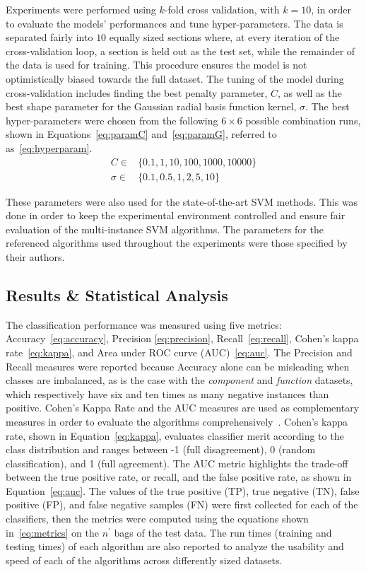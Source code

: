 \documentclass[preprint,12pt]{elsarticle}
\begin{document}
Experiments were performed using $k$-fold cross validation, with $k = 10$, in order to evaluate the models' performances and tune hyper-parameters. The data is separated fairly into $10$ equally sized sections where, at every iteration of the cross-validation loop, a section is held out as the test set, while the remainder of the data is used for training. This procedure ensures the model is not optimistically biased towards the full dataset. The tuning of the model during cross-validation includes finding the best penalty parameter, $C$, as well as the best shape parameter for the Gaussian radial basis function kernel, $\sigma$. The best hyper-parameters were chosen from the following $6 \times 6$ possible combination runs, shown in Equations~\eqref{eq:paramC} and~\eqref{eq:paramG}, referred to as~\eqref{eq:hyperparam}. 
\begin{subequations}
\label{eq:hyperparam}
\begin{align}
C \in  & \{0.1, 1, 10, 100, 1000, 10000\} \label{eq:paramC}\\
\sigma \in  & \{0.1, 0.5, 1, 2, 5, 10\} \label{eq:paramG}
\end{align}
\end{subequations}

These parameters were also used for the state-of-the-art SVM methods. This was done in order to keep the experimental environment controlled and ensure fair evaluation of the multi-instance SVM algorithms. The parameters for the referenced algorithms used throughout the experiments were those specified by their authors.

\subsection{Results \& Statistical Analysis}\label{subsec:results}
The classification performance was measured using five metrics: Accuracy~\eqref{eq:accuracy}, Precision \eqref{eq:precision}, Recall~\eqref{eq:recall}, Cohen's kappa rate~\eqref{eq:kappa}, and Area under ROC curve (AUC)~\eqref{eq:auc}. The Precision and Recall measures were reported because Accuracy alone can be misleading when classes are imbalanced, as is the case with the \textit{component} and \textit{function} datasets, which respectively have six and ten times as many negative instances than positive. Cohen's Kappa Rate and the AUC measures are used as complementary measures in order to evaluate the algorithms comprehensively~\citep{Bendavid2008}. Cohen's kappa rate, shown in Equation~\eqref{eq:kappa}, evaluates classifier merit according to the class distribution and ranges between -1 (full disagreement), 0 (random classification), and 1 (full agreement). The AUC metric highlights the trade-off between the true positive rate, or recall, and the false positive rate, as shown in Equation~\eqref{eq:auc}. The values of the true positive (TP), true negative (TN), false positive (FP), and false negative samples (FN) were first collected for each of the classifiers, then the metrics were computed using the equations shown in~\eqref{eq:metrics} on the $n^\prime$ bags of the test data. The run times (training and testing times) of each algorithm are also reported to analyze the usability and speed of each of the algorithms across differently sized datasets. 
\end{document}
